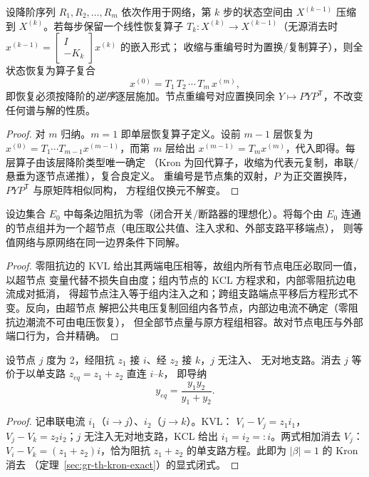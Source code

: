 \begin{proposition}[多级降阶的映射复合与逆序恢复]\label{sec:gr-th-compose-prop}
设降阶序列 $R_1,R_2,\dots,R_m$ 依次作用于网络，第 $k$ 步的状态空间由
$X^{(k-1)}$ 压缩到 $X^{(k)}$。若每步保留一个线性恢复算子
$T_k:X^{(k)}\to X^{(k-1)}$（无源消去时
$x^{(k-1)}=\begin{bmatrix}I\\-K_k\end{bmatrix}x^{(k)}$ 的嵌入形式；
收缩与重编号时为置换/复制算子），则全状态恢复为算子复合
\begin{equation}
x^{(0)}=T_1\,T_2\,\cdots\,T_m\,x^{(m)},
\end{equation}
即恢复必须按降阶的\emph{逆序}逐层施加。节点重编号对应置换同余
$Y\mapsto PYP^{\mathsf T}$，不改变任何谱与解的性质。
\end{proposition}
\begin{proof}
对 $m$ 归纳。$m=1$ 即单层恢复算子定义。设前 $m-1$ 层恢复为
$x^{(0)}=T_1\cdots T_{m-1}x^{(m-1)}$，而第 $m$ 层给出
$x^{(m-1)}=T_mx^{(m)}$，代入即得。每层算子由该层降阶类型唯一确定
（Kron 为回代算子，收缩为代表元复制，串联/悬垂为逐节点递推），复合良定义。
重编号是节点集的双射，$P$ 为正交置换阵，$PYP^{\mathsf T}$ 与原矩阵相似同构，
方程组仅换元不解变。
\end{proof}

\begin{proposition}[零阻抗等电位合并的精确性]\label{sec:gr-th-zmerge}
设边集合 $E_0$ 中每条边阻抗为零（闭合开关/断路器的理想化）。将每个由 $E_0$
连通的节点组并为一个超节点（电压取公共值、注入求和、外部支路平移端点），
则等值网络与原网络在同一边界条件下同解。
\end{proposition}
\begin{proof}
零阻抗边的 KVL 给出其两端电压相等，故组内所有节点电压必取同一值，以超节点
变量代替不损失自由度；组内节点的 KCL 方程求和，内部零阻抗边电流成对抵消，
得超节点注入等于组内注入之和；跨组支路端点平移后方程形式不变。反向，由超节点
解把公共电压复制回组内各节点，内部边电流不确定（零阻抗边潮流不可由电压恢复），
但全部节点量与原方程组相容。故对节点电压与外部端口行为，合并精确。
\end{proof}

\begin{theorem}\label{sec:gr-th-series}
设节点 $j$ 度为 2，经阻抗 $z_1$ 接 $i$、经 $z_2$ 接 $k$，$j$ 无注入、
无对地支路。消去 $j$ 等价于以单支路 $z_{eq}=z_1+z_2$ 直连 $i$--$k$，
即导纳
\begin{equation}
y_{eq}=\frac{y_1y_2}{y_1+y_2}.
\end{equation}
\end{theorem}
\begin{proof}
记串联电流 $i_1$（$i\to j$）、$i_2$（$j\to k$）。KVL：
$V_i-V_j=z_1i_1$，$V_j-V_k=z_2i_2$；$j$ 无注入无对地支路，KCL 给出
$i_1=i_2=:i$。两式相加消去 $V_j$：$V_i-V_k=(z_1+z_2)i$，恰为阻抗
$z_1+z_2$ 的单支路方程。此即为 $|\beta|=1$ 的 Kron 消去
（定理~\ref{sec:gr-th-kron-exact}）的显式闭式。
\end{proof}

